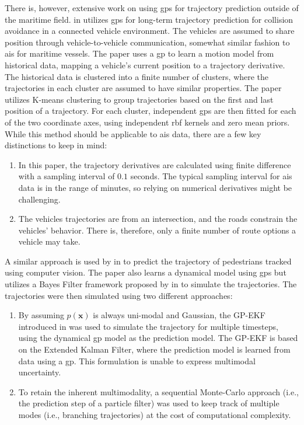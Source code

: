 There is, however, extensive work on using \acrshort{gp}s for trajectory prediction outside of the maritime field. \citeauthor{vehicle_gp_prediction} in \cite{vehicle_gp_prediction} utilizes \acrshort{gp}s for long-term trajectory prediction for collision avoidance in a connected vehicle environment. The vehicles are assumed to share position through vehicle-to-vehicle communication, somewhat similar fashion to \acrshort{ais} for maritime vessels. The paper uses a \acrshort{gp} to learn a motion model from historical data, mapping a vehicle's current position to a trajectory derivative. The historical data is clustered into a finite number of clusters, where the trajectories in each cluster are assumed to have similar properties. The paper utilizes K-means clustering \cite{murphy} to group trajectories based on the first and last position of a trajectory. For each cluster, independent \acrshort{gp}s are then fitted for each of the two coordinate axes, using independent \acrshort{rbf} kernels and zero mean priors. While this method should be applicable to \acrshort{ais} data, there are a few key distinctions to keep in mind:
\begin{enumerate}
    \item In this paper, the trajectory derivatives are calculated using finite difference with a sampling interval of $0.1$ seconds. The typical sampling interval for \acrshort{ais} data is in the range of minutes, so relying on numerical derivatives might be challenging.
    \item The vehicles trajectories are from an intersection, and the roads constrain the vehicles' behavior. There is, therefore, only a finite number of route options a vehicle may take.
\end{enumerate}

A similar approach is used by \citeauthor{pedestrian} in \cite{pedestrian} to predict the trajectory of pedestrians tracked using computer vision. The paper also learns a dynamical model using \acrshort{gp}s but utilizes a Bayes Filter framework proposed by \citeauthor{gpekf} in \cite{gpekf} to simulate the trajectories. The trajectories were then simulated using two different approaches:
\begin{enumerate}
    \item By assuming $p(\boldsymbol{x})$ is always uni-modal and Gaussian, the GP-EKF introduced in \cite{gpekf} was used to simulate the trajectory for multiple timesteps, using the dynamical \acrshort{gp} model as the prediction model. The GP-EKF is based on the Extended Kalman Filter, where the prediction model is learned from data using a \acrshort{gp}. This formulation is unable to express multimodal uncertainty.
    \item To retain the inherent multimodality, a sequential Monte-Carlo approach (i.e., the prediction step of a particle filter) was used to keep track of multiple modes (i.e., branching trajectories) at the cost of computational complexity.  
\end{enumerate}





